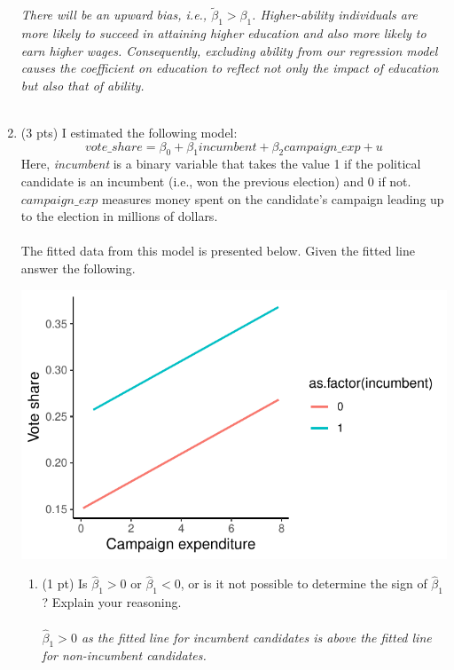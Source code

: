 \documentclass{./../../Latex/tests}
\begin{document}
\begin{enumerate}
\textit{There will be an upward bias, i.e., $\tilde{\beta}_1>\beta_1$. Higher-ability individuals are more likely to succeed in attaining higher education and also more likely to earn higher wages. Consequently, excluding ability from our regression model causes the coefficient on education to reflect not only the impact of education but also that of ability.} \\~\\

 \item (3 pts) I estimated the following model:
$$ vote\_share = \beta_0 + \beta_1 incumbent + \beta_2 campaign\_exp +u  $$
Here, \textit{incumbent} is a binary variable that takes the value 1 if the political candidate is an incumbent (i.e., won the previous election) and 0 if not. $campaign\_exp$ measures money spent on the candidate's campaign leading up to the election in millions of dollars. \\~\\
The fitted data from this model is presented below. Given the fitted line answer the following.
\begin{center}
	\includegraphics{./../../output/sample_final_incmb.pdf}
\end{center}
\begin{enumerate}
  \item (1 pt) Is $\hat{\beta}_1>0$ or $\hat{\beta}_1<0$, or is it not possible to determine the sign of $\hat{\beta}_1$? Explain your reasoning. \\~\\
  
  \textit{  $\hat{\beta}_1>0$ as the fitted line for incumbent candidates is above the fitted line for non-incumbent candidates.} \\~\\
  

\end{enumerate}
\end{enumerate}
\end{document}
